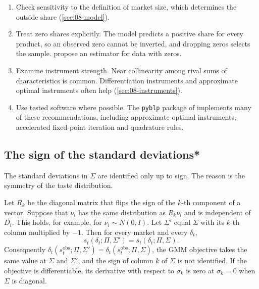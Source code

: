 \begin{enumerate}
  these exist. When the price coefficient has a random component, report the share of consumers with a positive price
  coefficient. \citet[p.~329]{Nevo2001} reports 0.7 percent for his main specification, against as much as 13 percent
  in specifications without demographic interactions.
  \item Check sensitivity to the definition of market size, which determines the outside share
  (\cref{sec:08-model}).
  \item Treat zero shares explicitly. The model predicts a positive share for every product, so an observed zero
  cannot be inverted, and dropping zeros selects the sample. \citet{GandhiLuShi2023} propose an estimator for data with
  zeros.
  \item Examine instrument strength. Near collinearity among rival sums of characteristics is common. Differentiation
  instruments \citep{GandhiHoude2019} and approximate optimal instruments \citep{ReynaertVerboven2014} often help
  (\cref{sec:08-instruments}).
  \item Use tested software where possible. The \texttt{pyblp} package of \citet[Sections~3 and~4]{ConlonGortmaker2020}
  implements many of these recommendations, including approximate optimal instruments, accelerated fixed-point
  iteration and quadrature rules.
\end{enumerate}

\subsection{The sign of the standard deviations*}\label{sec:08-signsigma}

The standard deviations in $\Sigma$ are identified only up to sign. The reason is the symmetry of the taste
distribution.

\begin{proposition}\label{prop:08-signsigma}
Let $R_k$ be the diagonal matrix that flips the sign of the $k$-th component of a vector. Suppose that $\nu_i$ has the
same distribution as $R_k\nu_i$ and is independent of $D_i$. This holds, for example, for $\nu_i \sim N(0, I)$. Let $\Sigma'$ equal $\Sigma$ with its $k$-th column multiplied by $-1$. Then for every market
and every $\delta_t$,
\begin{equation}\label{eq:08-signsigma}
  s_t(\delta_t; \Pi, \Sigma') = s_t(\delta_t; \Pi, \Sigma).
\end{equation}
Consequently $\delta_t(s^{\text{obs}}_t; \Pi, \Sigma') = \delta_t(s^{\text{obs}}_t; \Pi, \Sigma)$, the GMM objective takes the same
value at $\Sigma$ and $\Sigma'$, and the sign of column $k$ of $\Sigma$ is not identified. If the objective is
differentiable, its derivative with respect to $\sigma_k$ is zero at $\sigma_k = 0$ when $\Sigma$ is diagonal.
\end{proposition}


